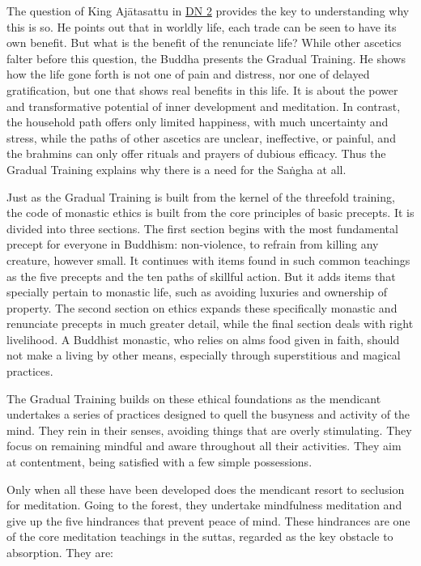 \documentclass[12pt,openany]{book}%
\begin{document}
The question of King \textsanskrit{Ajātasattu} in \href{https://suttacentral.net/dn2}{DN 2} provides the key to understanding why this is so. He points out that in worldly life, each trade can be seen to have its own benefit. But what is the benefit of the renunciate life? While other ascetics falter before this question, the Buddha presents the Gradual Training. He shows how the life gone forth is not one of pain and distress, nor one of delayed gratification, but one that shows real benefits in this life. It is about the power and transformative potential of inner development and meditation. In contrast, the household path offers only limited happiness, with much uncertainty and stress, while the paths of other ascetics are unclear, ineffective, or painful, and the brahmins can only offer rituals and prayers of dubious efficacy. Thus the Gradual Training explains why there is a need for the \textsanskrit{Saṅgha} at all.

Just as the Gradual Training is built from the kernel of the threefold training, the code of monastic ethics is built from the core principles of basic precepts. It is divided into three sections. The first section begins with the most fundamental precept for everyone in Buddhism: non-violence, to refrain from killing any creature, however small. It continues with items found in such common teachings as the five precepts and the ten paths of skillful action. But it adds items that specially pertain to monastic life, such as avoiding luxuries and ownership of property. The second section on ethics expands these specifically monastic and renunciate precepts in much greater detail, while the final section deals with right livelihood. A Buddhist monastic, who relies on alms food given in faith, should not make a living by other means, especially through superstitious and magical practices.

The Gradual Training builds on these ethical foundations as the mendicant undertakes a series of practices designed to quell the busyness and activity of the mind. They rein in their senses, avoiding things that are overly stimulating. They focus on remaining mindful and aware throughout all their activities. They aim at contentment, being satisfied with a few simple possessions.

Only when all these have been developed does the mendicant resort to seclusion for meditation. Going to the forest, they undertake mindfulness meditation and give up the five hindrances that prevent peace of mind. These hindrances are one of the core meditation teachings in the suttas, regarded as the key obstacle to absorption. They are:
\end{document}
